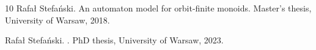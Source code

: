 \documentclass[10pt,a4paper]{amsart}
\numberwithin{equation}{section}
\theoremstyle{plain}
\begin{document}
\begin{thebibliography}{10}
Rafa{\l} Stefa{\'n}ski.
\newblock An automaton model for orbit-finite monoids.
\newblock Master's thesis, University of Warsaw, 2018.

Rafa{\l} Stefa{\'n}ski.
.
\newblock PhD thesis, University of Warsaw, 2023.

\end{thebibliography}
\end{document}
